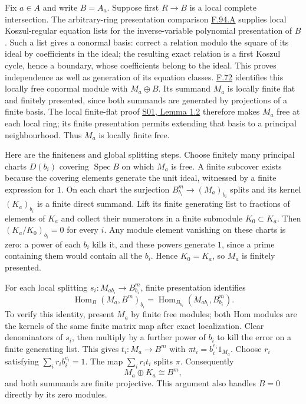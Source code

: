 \documentclass[11pt,a4paper,openany]{report}
\begin{document}
Fix \(a\in A\) and write \(B=A_a\). Suppose first \(R\to B\) is a local complete intersection. The arbitrary-ring presentation comparison \hyperref[AG-RG-S05-more-algebra-lemma-lci-presentation-independent]{F.94.A} supplies local Koszul-regular equation lists for the inverse-variable polynomial presentation of \(B\). Such a list gives a conormal basis: correct a relation modulo the square of its ideal by coefficients in the ideal; the resulting exact relation is a first Koszul cycle, hence a boundary, whose coefficients belong to the ideal. This proves independence as well as generation of its equation classes. \hyperref[AG-RG-S05-algebra-lemma-principal-localization-NL]{F.72} identifies this locally free conormal module with \(M_a\oplus B\). Its summand \(M_a\) is locally finite flat and finitely presented, since both summands are generated by projections of a finite basis. The local finite-flat proof \href{https://github.com/KokunoYumeto/open-math-courses/blob/main/docs/courses/AG-RG/AG-RG-S01.md}{S01, Lemma 1.2} therefore makes \(M_a\) free at each local ring; its finite presentation permits extending that basis to a principal neighbourhood. Thus \(M_a\) is locally finite free.

Here are the finiteness and global splitting steps. Choose finitely many principal charts \(D(b_i)\) covering \(\operatorname{Spec}B\) on which \(M_a\) is free. A finite subcover exists because the covering elements generate the unit ideal, witnessed by a finite expression for \(1\). On each chart the surjection \(B_{b_i}^m\to(M_a)_{b_i}\) splits and its kernel \((K_a)_{b_i}\) is a finite direct summand. Lift its finite generating list to fractions of elements of \(K_a\) and collect their numerators in a finite submodule \(K_0\subset K_a\). Then \((K_a/K_0)_{b_i}=0\) for every \(i\). Any module element vanishing on these charts is zero: a power of each \(b_i\) kills it, and these powers generate \(1\), since a prime containing them would contain all the \(b_i\). Hence \(K_0=K_a\), so \(M_a\) is finitely presented.

For each local splitting \(s_i:M_{ab_i}\to B_{b_i}^m\), finite presentation identifies \[\operatorname{Hom}_B(M_a,B^m)_{b_i}=\operatorname{Hom}_{B_{b_i}}(M_{ab_i},B_{b_i}^m).\] To verify this identity, present \(M_a\) by finite free modules; both Hom modules are the kernels of the same finite matrix map after exact localization. Clear denominators of \(s_i\), then multiply by a further power of \(b_i\) to kill the error on a finite generating list. This gives \(t_i:M_a\to B^m\) with \(\pi t_i=b_i^{e_i}1_{M_a}\). Choose \(r_i\) satisfying \(\sum_i r_i b_i^{e_i}=1\). The map \(\sum_i r_it_i\) splits \(\pi\). Consequently \[M_a\oplus K_a\cong B^m,\] and both summands are finite projective. This argument also handles \(B=0\) directly by its zero modules.
\end{document}

